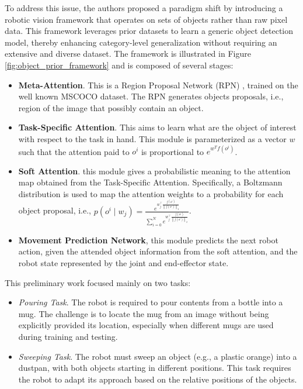 To address this issue, the authors proposed a paradigm shift by introducing a robotic vision framework that operates on sets of objects rather than raw pixel data. This framework leverages prior datasets to learn a generic object detection model, thereby enhancing category-level generalization without requiring an extensive and diverse dataset. The framework is illustrated in Figure \ref{fig:object_prior_framework} and is composed of several stages:
\begin{itemize}
    \item \textbf{Meta-Attention}. This is a Region Proposal Network (RPN) \cite{fastrcnn}, trained on the well known MSCOCO \cite{lin2014microsoft} dataset. The RPN generates objects proposals, i.e., region of the image that possibly contain an object.
    \item \textbf{Task-Specific Attention}. This aims to learn what are the object of interest with respect to the task in hand. This module is parameterized as a vector $w$ such that the attention paid to $o^i$ is proportional to $e^{w^Tf(o^i)}$.
    \item \textbf{Soft Attention}. this module gives a probabilistic meaning to the attention map obtained from the Task-Specific Attention. Specifically, a Boltzmann distribution is used to map the attention weights to a probability for each object proposal, i.e., $p\left(o^i \mid w_j\right)=\frac{e^{w_j^{\top} \frac{f\left(o^i\right)}{\left\|f\left(o^i\right)\right\|_2}}}{\sum_{i=0}^N e^{w_j^{\top} \frac{f\left(o^i\right)}{\left\|f\left(o^i\right)\right\|_2}}}$.
    \item \textbf{Movement Prediction Network}, this module predicts the next robot action, given the attended object information from the soft attention, and the robot state represented by the joint and end-effector state.
\end{itemize}

This preliminary work focused mainly on two tasks:
\begin{itemize}
    \item  \textit{Pouring Task}. The robot is required to pour contents from a bottle into a mug. The challenge is to locate the mug from an image without being explicitly provided its location, especially when different mugs are used during training and testing.
    \item \textit{Sweeping Task}. The robot must sweep an object (e.g., a plastic orange) into a dustpan, with both objects starting in different positions. This task requires the robot to adapt its approach based on the relative positions of the objects.
\end{itemize}
